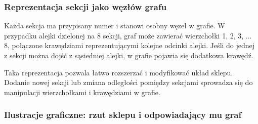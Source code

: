 \subsubsection{Reprezentacja sekcji jako węzłów grafu}
Każda sekcja ma przypisany numer i stanowi osobny węzeł w grafie. W przypadku alejki dzielonej na 8 sekcji, graf może zawierać wierzchołki 1, 2, 3, ... 8, połączone krawędziami reprezentującymi kolejne odcinki alejki. Jeśli do jednej z sekcji można dojść z sąsiedniej alejki, w grafie pojawia się dodatkowa krawędź.

Taka reprezentacja pozwala łatwo rozszerzać i modyfikować układ sklepu. Dodanie nowej sekcji lub zmiana odległości pomiędzy sekcjami sprowadza się do manipulacji wierzchołkami i krawędziami w grafie.

\subsubsection{Ilustracje graficzne: rzut sklepu i odpowiadający mu graf}

